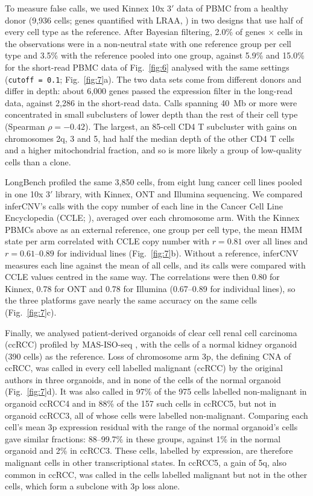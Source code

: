 
To measure false calls, we used Kinnex 10x 3$'$ data of PBMC from a healthy donor (9,936 cells; genes quantified with LRAA, \citealp{yu2026lraa}) in two designs that use half of every cell type as the reference. After Bayesian filtering, 2.0\% of genes $\times$ cells in the observations were in a non-neutral state with one reference group per cell type and 3.5\% with the reference pooled into one group, against 5.9\% and 15.0\% for the short-read PBMC data of Fig.~\ref{fig:6} analysed with the same settings (\texttt{cutoff\ =\ 0.1}; Fig.~\ref{fig:7}a). The two data sets come from different donors and differ in depth: about 6,000 genes passed the expression filter in the long-read data, against 2,286 in the short-read data. Calls spanning 40~Mb or more were concentrated in small subclusters of lower depth than the rest of their cell type (Spearman $\rho = -0.42$). The largest, an 85-cell CD4 T subcluster with gains on chromosomes 2q, 3 and 5, had half the median depth of the other CD4 T cells and a higher mitochondrial fraction, and so is more likely a group of low-quality cells than a clone.

LongBench \citep{you2025longbench} profiled the same 3,850 cells, from eight lung cancer cell lines pooled in one 10x 3$'$ library, with Kinnex, ONT and Illumina sequencing. We compared inferCNV's calls with the copy number of each line in the Cancer Cell Line Encyclopedia (CCLE; \citealp{ghandi2019ccle}), averaged over each chromosome arm. With the Kinnex PBMCs above as an external reference, one group per cell type, the mean HMM state per arm correlated with CCLE copy number with $r = 0.81$ over all lines and $r = 0.61$--$0.89$ for individual lines (Fig.~\ref{fig:7}b). Without a reference, inferCNV measures each line against the mean of all cells, and its calls were compared with CCLE values centred in the same way. The correlations were then 0.80 for Kinnex, 0.78 for ONT and 0.78 for Illumina (0.67--0.89 for individual lines), so the three platforms gave nearly the same accuracy on the same cells (Fig.~\ref{fig:7}c).

Finally, we analysed patient-derived organoids of clear cell renal cell carcinoma (ccRCC) profiled by MAS-ISO-seq \citep{zajac2025ccrcc}, with the cells of a normal kidney organoid (390 cells) as the reference. Loss of chromosome arm 3p, the defining CNA of ccRCC, was called in every cell labelled malignant (ccRCC) by the original authors in three organoids, and in none of the cells of the normal organoid (Fig.~\ref{fig:7}d). It was also called in 97\% of the 975 cells labelled non-malignant in organoid ccRCC4 and in 88\% of the 157 such cells in ccRCC5, but not in organoid ccRCC3, all of whose cells were labelled non-malignant. Comparing each cell's mean 3p expression residual with the range of the normal organoid's cells gave similar fractions: 88--99.7\% in these groups, against 1\% in the normal organoid and 2\% in ccRCC3. These cells, labelled by expression, are therefore malignant cells in other transcriptional states. In ccRCC5, a gain of 5q, also common in ccRCC, was called in the cells labelled malignant but not in the other cells, which form a subclone with 3p loss alone.


